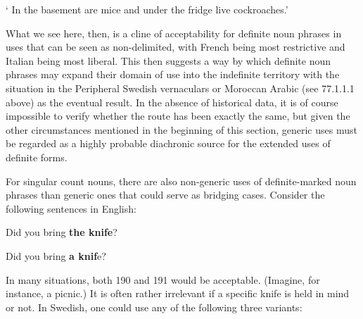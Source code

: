 \begin{styleTranslation}
‘ In the basement are mice and under the fridge live cockroaches.’  

\end{styleTranslation}

\begin{styleBodyTextFirst}
What we see here, then, is a cline of acceptability for definite noun phrases in uses that can be seen as non-delimited, with French being most restrictive and Italian being most liberal. This then suggests a way by which definite noun phrases may expand their domain of use into the indefinite territory with the situation in the Peripheral Swedish vernaculars or Moroccan Arabic (see 77.1.1.1 above) as the eventual result. In the absence of historical data, it is of course impossible to verify whether the route has been exactly the same, but given the other circumstances mentioned in the beginning of this section, generic uses must be regarded as a highly probable diachronic source for the extended uses of definite forms. 

\end{styleBodyTextFirst}

\begin{styleBodytextC}
For singular count nouns, there are also non-generic uses of definite-marked noun phrases than generic ones that could serve as bridging cases. Consider the following sentences in English:

\end{styleBodytextC}

\begin{listWWNumileveli}
\item 

\begin{styleExample}
\label{bkm:Ref123724733}Did you bring \textbf{the knife}?

\end{styleExample}

\item 

\begin{styleExample}
\label{bkm:Ref123724734}Did you bring \textbf{a knif}e?

\end{styleExample}

\end{listWWNumileveli}

\begin{styleBodyTextFirst}
In many situations, both 190 and 191 would be acceptable. (Imagine, for instance, a picnic.) It is often rather irrelevant if a specific knife is held in mind or not. In Swedish, one could use any of the following three variants:

\end{styleBodyTextFirst}

